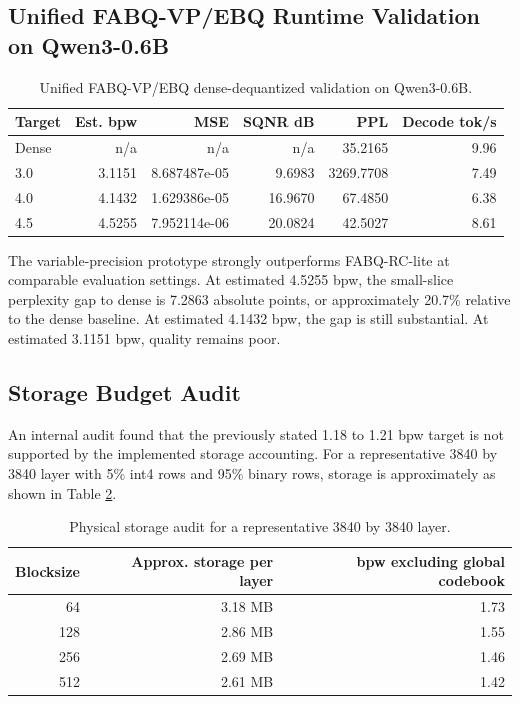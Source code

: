 \documentclass[11pt]{article}
\begin{document}
\subsection{Unified FABQ-VP/EBQ Runtime Validation on Qwen3-0.6B}

\begin{table}[h]
\centering
\begin{tabular}{lrrrrr}
\toprule
Target & Est. bpw & MSE & SQNR dB & PPL & Decode tok/s \\
\midrule
Dense & n/a & n/a & n/a & 35.2165 & 9.96 \\
3.0 & 3.1151 & 8.687487e-05 & 9.6983 & 3269.7708 & 7.49 \\
4.0 & 4.1432 & 1.629386e-05 & 16.9670 & 67.4850 & 6.38 \\
4.5 & 4.5255 & 7.952114e-06 & 20.0824 & 42.5027 & 8.61 \\
\bottomrule
\end{tabular}
\caption{Unified FABQ-VP/EBQ dense-dequantized validation on Qwen3-0.6B.}
\label{tab:unified}
\end{table}

The variable-precision prototype strongly outperforms FABQ-RC-lite at comparable evaluation settings. At estimated 4.5255 bpw, the small-slice perplexity gap to dense is 7.2863 absolute points, or approximately 20.7\% relative to the dense baseline. At estimated 4.1432 bpw, the gap is still substantial. At estimated 3.1151 bpw, quality remains poor.

\subsection{Storage Budget Audit}

An internal audit found that the previously stated 1.18 to 1.21 bpw target is not supported by the implemented storage accounting. For a representative 3840 by 3840 layer with 5\% int4 rows and 95\% binary rows, storage is approximately as shown in Table \ref{tab:storage}.

\begin{table}[h]
\centering
\begin{tabular}{rrr}
\toprule
Blocksize & Approx. storage per layer & bpw excluding global codebook \\
\midrule
64 & 3.18 MB & 1.73 \\
128 & 2.86 MB & 1.55 \\
256 & 2.69 MB & 1.46 \\
512 & 2.61 MB & 1.42 \\
\bottomrule
\end{tabular}
\caption{Physical storage audit for a representative 3840 by 3840 layer.}
\label{tab:storage}
\end{table}
\end{document}
